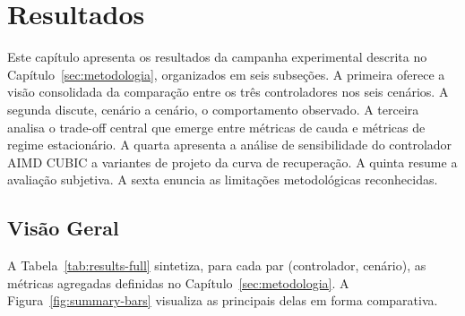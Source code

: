 \section{Resultados}\label{sec:resultados}

Este capítulo apresenta os resultados da campanha experimental
descrita no Capítulo~\ref{sec:metodologia}, organizados em seis
subseções. A primeira oferece a visão consolidada da comparação
entre os três controladores nos seis cenários. A segunda
discute, cenário a cenário, o comportamento observado. A
terceira analisa o trade-off central que emerge entre métricas
de cauda e métricas de regime estacionário. A quarta apresenta
a análise de sensibilidade do controlador AIMD CUBIC a
variantes de projeto da curva de recuperação. A quinta resume
a avaliação subjetiva. A sexta enuncia as limitações
metodológicas reconhecidas.

\subsection{Visão Geral}

A Tabela~\ref{tab:results-full} sintetiza, para cada par
(controlador, cenário), as métricas agregadas definidas no
Capítulo~\ref{sec:metodologia}. A Figura~\ref{fig:summary-bars}
visualiza as principais delas em forma comparativa.

